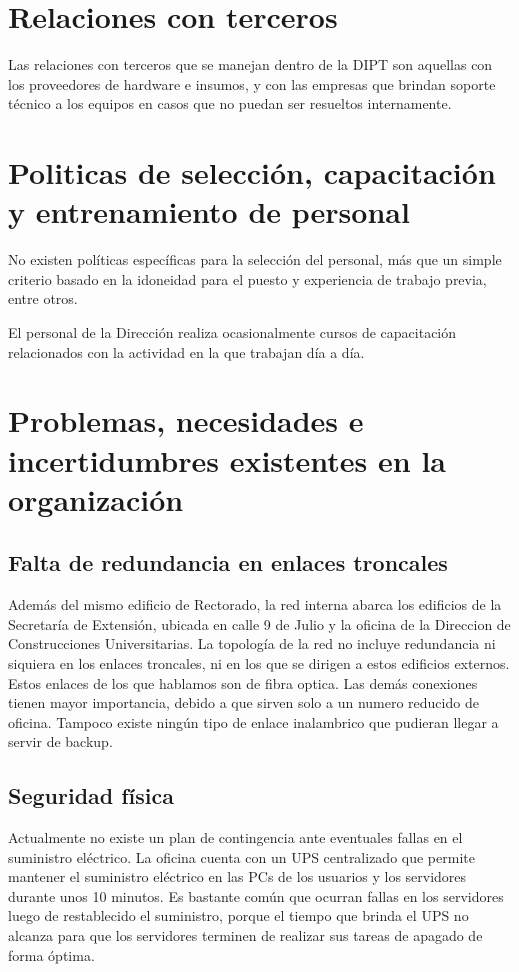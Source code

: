 \documentclass[a4paper,11pt,oneside]{article}
\begin{document}
\section{Relaciones con terceros}
Las relaciones con terceros que se manejan dentro de la DIPT son
aquellas con los proveedores de hardware e insumos, y con las empresas
que brindan soporte técnico a los equipos en casos que no puedan ser
resueltos internamente.
%
\section{Politicas de selección, capacitación y entrenamiento de personal}
%
No existen políticas específicas para la selección del personal, más
que un simple criterio basado en la idoneidad para el puesto y
experiencia de trabajo previa, entre otros.

El personal de la Dirección realiza ocasionalmente cursos de
capacitación relacionados con la actividad en la que trabajan día a
día.
%
\section{Problemas, necesidades e incertidumbres existentes en la organización}
%
\subsection*{Falta de redundancia en enlaces troncales}
Además del mismo edificio de Rectorado, la red interna abarca los
edificios de la Secretaría de Extensión, ubicada en calle 9 de Julio y
la oficina de la Direccion de Construcciones Universitarias.  La
topología de la red no incluye redundancia ni siquiera en los enlaces
troncales, ni en los que se dirigen a estos edificios externos. Estos
enlaces de los que hablamos son de fibra
optica. Las demás conexiones tienen mayor importancia, debido a que
sirven solo a un numero reducido de oficina. Tampoco existe ningún
tipo de enlace inalambrico que pudieran llegar a servir de backup.
%
%
%
\subsection*{Seguridad física}
Actualmente no existe un plan de contingencia ante eventuales fallas
en el suministro eléctrico. La oficina cuenta con un UPS centralizado
que permite mantener el suministro eléctrico en las PCs de los
usuarios y los servidores durante unos 10 minutos. Es bastante común
que ocurran fallas en los servidores luego de restablecido el
suministro, porque el tiempo que brinda el UPS no alcanza para que los servidores 
terminen de realizar sus tareas de apagado de forma óptima.
\end{document}

